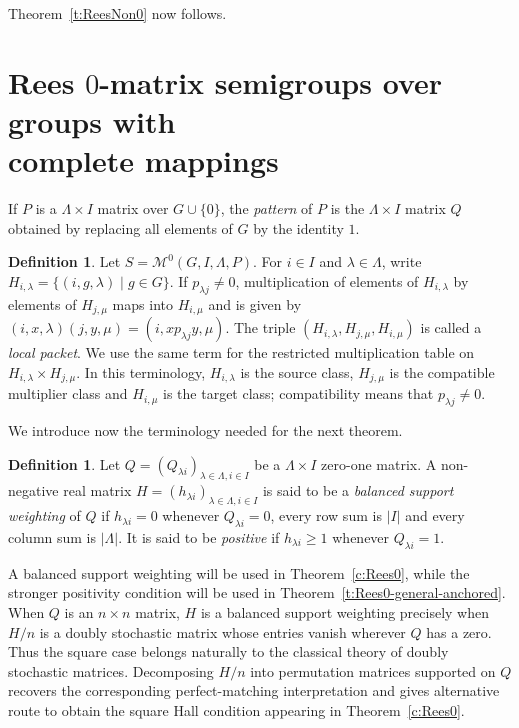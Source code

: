 \documentclass[11pt]{article}
\theoremstyle{plain}
\theoremstyle{remark}
\theoremstyle{definition}
\newtheorem{definition}[theorem]{Definition}
\newtheorem*{quoteddefinition}{Definition}
\theoremstyle{plain}
\begin{document}
Theorem~\ref{t:ReesNon0} now follows.

\section[Rees 0-matrix semigroups over groups with complete mappings]{Rees $0$-matrix semigroups over groups with\\complete mappings}
\label{Sec:Rees0-matrix-1}

If $P$ is a $\Lambda\times I$ matrix over $G\cup\{0\}$, the \emph{pattern} of
$P$ is the $\Lambda \times I$ matrix $Q$ obtained by replacing all elements of
$G$ by the identity $1$.

\begin{definition}\label{d:local-packet}
Let $S=\mathcal M^0(G,I,\Lambda,P)$. For $i\in I$ and $\lambda\in\Lambda$, write
\(H_{i,\lambda}=\{(i,g,\lambda)\mid g\in G\}.\)
If $p_{\lambda j}\ne0$, multiplication of elements of $H_{i,\lambda}$ by
elements of $H_{j,\mu}$ maps into $H_{i,\mu}$ and is given by
\((i,x,\lambda)(j,y,\mu)=(i,xp_{\lambda j}y,\mu).\)
The triple
\((H_{i,\lambda},H_{j,\mu},H_{i,\mu})\)
is called a \emph{local packet}. We use the same term for the restricted multiplication table on $H_{i,\lambda}\times H_{j,\mu}$. {In this terminology, $H_{i,\lambda}$ is the source class, $H_{j,\mu}$ is the compatible multiplier class and $H_{i,\mu}$ is the target class; compatibility means that $p_{\lambda j}\ne0$.}
\end{definition}

\begingroup


We introduce now the terminology needed for the next theorem.

\begin{quoteddefinition}
Let $Q=(Q_{\lambda i})_{\lambda\in\Lambda,i\in I}$ be a
$\Lambda\times I$ zero-one matrix. A non-negative real matrix
$H=(h_{\lambda i})_{\lambda\in\Lambda,i\in I}$ is said to be a
\emph{balanced support weighting} of $Q$ if $h_{\lambda i}=0$ whenever
$Q_{\lambda i}=0$, every row sum is $|I|$ and every column sum is
$|\Lambda|$. It is said to be \emph{positive} if $h_{\lambda i}\ge1$
whenever $Q_{\lambda i}=1$.
\end{quoteddefinition}

{A balanced support weighting will be used in
Theorem~\ref{c:Rees0}, while the stronger positivity condition will be used in
Theorem~\ref{t:Rees0-general-anchored}. When $Q$ is an $n\times n$ matrix,
$H$ is a balanced support weighting precisely when $H/n$ is a doubly
stochastic matrix whose entries vanish wherever $Q$ has a zero. Thus the
square case belongs naturally to the classical theory of doubly stochastic
matrices. Decomposing $H/n$ into permutation matrices supported on $Q$
recovers the corresponding perfect-matching interpretation and gives alternative
route to obtain the square Hall condition appearing in Theorem~\ref{c:Rees0}.} 
\end{document}

